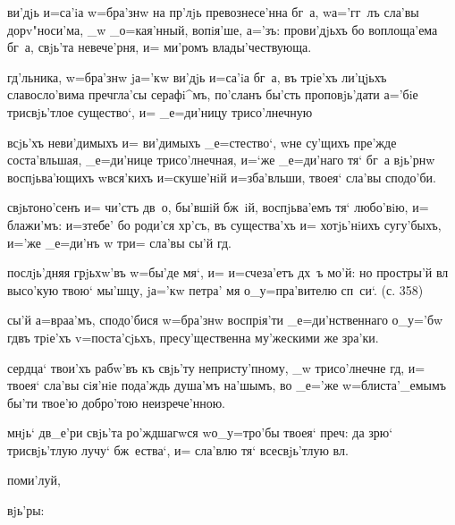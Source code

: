 
  ви'дjь и=са'iа w=бра'знw на 
пр'лjь превознесе'нна бг~а, w\т а='гг~лъ сла'вы 
дорv"носи'ма, _w _о=кая'нный, вопiя'ше, а='зъ: 
прови'дjьхъ бо воплоща'ема бг~а, свjь'та невече'рня, и= 
ми'ромъ влады'чествующа.

 гд'льника, w=бра'знw jа='кw 
ви'дjь и=са'iа бг~а, въ трiе'хъ ли'цjьхъ славосло'вима 
преч гла'сы серафi^мъ, по'сланъ бы'сть 
проповjь'дати а='бiе трисвjь'тлое существо`, и= 
_е=ди'ницу трисо'лнечную 

  всjь'хъ неви'димыхъ и= ви'димыхъ 
_е=стество`, w\т не су'щихъ пре'жде соста'вльшая, 
_е=ди'нице трисо'лнечная, и=`же _е=ди'наго тя` бг~а 
вjь'рнw воспjьва'ющихъ w\т вся'кихъ и=скуше'нiй 
и=зба'вльши, твоея` сла'вы сподо'би.

   свjьтоно'сенъ и= чи'стъ 
дв~о, бы'вшiй бж~iй, воспjьва'емъ тя` любо'вiю, и= 
блажи'мъ: и=з\ъ тебе' бо роди'ся хр'съ, въ 
существа'хъ и= хотjь'нiихъ сугу'быхъ, и='же _е=ди'нъ w\т 
тр и= сла'вы сы'й гд.


  послjь'дняя грjьхw'въ w=бы'де 
мя`, и= и=счеза'етъ дх~ъ мо'й: но простры'й вл 
высо'кую твою` мы'шцу, jа='кw петра' мя о_у=пра'вителю 
сп~си`. (с. 358)

 сы'й а=враа'мъ, сподо'бися w=бра'знw 
воспрiя'ти _е=ди'нственнаго о_у='бw гд въ трiе'хъ 
v=поста'сjьхъ, пресу'щественна му'жескими же зра'ки. 

  сердца` твои'хъ рабw'въ къ 
свjь'ту непристу'пному, _w трисо'лнечне гд, и= твоея` 
сла'вы сiя'нiе пода'ждь душа'мъ на'шымъ, во _е='же 
w=блиста'_емымъ бы'ти твое'ю добро'тою неизрече'нною.

   мнjь` дв_е'ри свjь'та 
ро'ждшагwся w\т о_у=тро'бы твоея` преч: да зрю` 
трисвjь'тлую лучу` бж~ества`, и= сла'влю тя` всесвjь'тлую 
вл.

 поми'луй, 


  вjь'ры:

